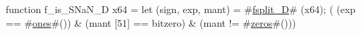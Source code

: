 function f_is_SNaN_D   x64 = {
  let (sign, exp, mant) = #\hyperref[sailRISCVzfsplitzyD]{fsplit\_D}# (x64);
  (  (exp == #\hyperref[sailRISCVzones]{ones}#())
   & (mant [51] == bitzero)
   & (mant != #\hyperref[sailRISCVzzzeros]{zeros}#()))
}
